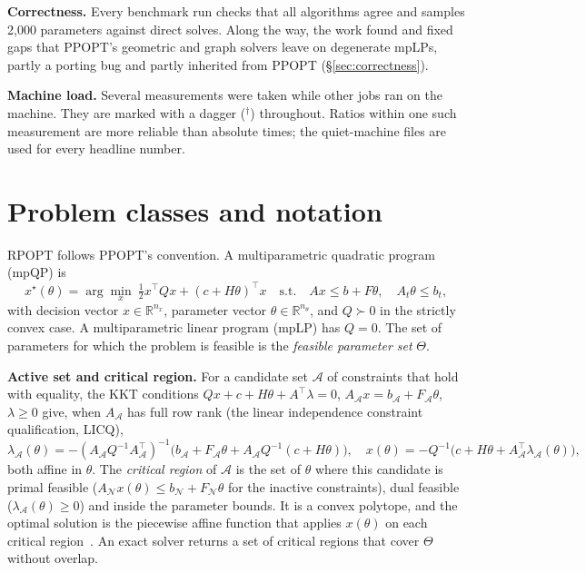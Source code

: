 \documentclass[10pt,a4paper]{article}
\newcommand{\busy}{$^\dagger$}
\newcommand{\rpopt}{RPOPT}
\newcommand{\ppopt}{PPOPT}
\begin{document}
\textbf{Correctness.} Every benchmark run checks that all algorithms agree and samples 2,000 parameters against direct
solves. Along the way, the work found and fixed gaps that \ppopt{}'s geometric and graph solvers leave on degenerate
mpLPs, partly a porting bug and partly inherited from \ppopt{} (\S\ref{sec:correctness}).

\textbf{Machine load.} Several measurements were taken while other jobs ran on the machine. They are marked with a
dagger (\busy{}) throughout. Ratios within one such measurement are more reliable than absolute times; the quiet-machine
files are used for every headline number.

\section{Problem classes and notation}
\label{sec:problems}

\rpopt{} follows \ppopt{}'s convention. A multiparametric quadratic program (mpQP) is
\begin{equation}
  x^\star(\theta)=\arg\min_x\ \tfrac12 x^\top Q x+(c+H\theta)^\top x
  \quad\text{s.t.}\quad Ax\le b+F\theta,\quad A_t\theta\le b_t,
  \label{eq:mpqp}
\end{equation}
with decision vector $x\in\mathbb R^{n_x}$, parameter vector $\theta\in\mathbb R^{n_\theta}$, and $Q\succ0$ in the
strictly convex case. A multiparametric linear program (mpLP) has $Q=0$. The set of parameters for which the problem
is feasible is the \emph{feasible parameter set} $\Theta$.

\textbf{Active set and critical region.} For a candidate set $\mathcal A$ of constraints that hold with equality, the
KKT conditions $Qx+c+H\theta+A^\top\lambda=0$, $A_{\mathcal A}x=b_{\mathcal A}+F_{\mathcal A}\theta$, $\lambda\ge0$ give,
when $A_{\mathcal A}$ has full row rank (the linear independence constraint qualification, LICQ),
\begin{equation}
  \lambda_{\mathcal A}(\theta)=-(A_{\mathcal A}Q^{-1}A_{\mathcal A}^\top)^{-1}\bigl(b_{\mathcal A}+F_{\mathcal A}\theta+A_{\mathcal A}Q^{-1}(c+H\theta)\bigr),
  \quad x(\theta)=-Q^{-1}\bigl(c+H\theta+A_{\mathcal A}^\top\lambda_{\mathcal A}(\theta)\bigr),
\end{equation}
both affine in $\theta$. The \emph{critical region} of $\mathcal A$ is the set of $\theta$ where this candidate is
primal feasible ($A_{\mathcal N}x(\theta)\le b_{\mathcal N}+F_{\mathcal N}\theta$ for the inactive constraints),
dual feasible ($\lambda_{\mathcal A}(\theta)\ge0$) and inside the parameter bounds. It is a convex polytope, and
the optimal solution is the piecewise affine function that applies $x(\theta)$ on each critical region~\cite{bemporad2002explicit}.
An exact solver returns a set of critical regions that cover $\Theta$ without overlap.
\end{document}
